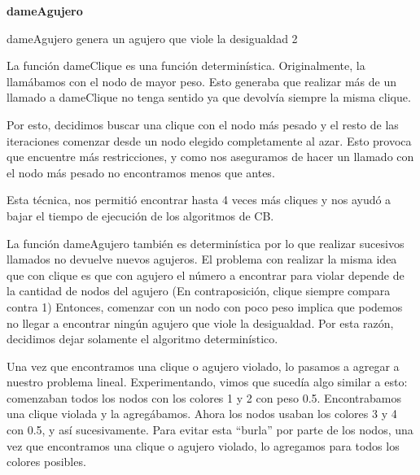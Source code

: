 \documentclass[a4paper, 10pt, twoside]{article}
\begin{document}
\begin{algorithm}[H]
	\textbf{dameAgujero}\\
\caption{dameAgujero genera un agujero que viole la desigualdad 2}
\end{algorithm}


La función dameClique es una función determinística. Originalmente, la llamábamos con el nodo de mayor peso. Esto generaba que realizar más de un llamado a dameClique no tenga sentido ya que devolvía siempre la misma clique. 

Por esto, decidimos buscar una clique con el nodo más pesado y el resto de las iteraciones comenzar desde un nodo elegido completamente al azar. Esto provoca que encuentre más restricciones, y como nos aseguramos de hacer un llamado con el nodo más pesado no encontramos menos que antes.

Esta técnica, nos permitió encontrar hasta 4 veces más cliques y nos ayudó a bajar el tiempo de ejecución de los algoritmos de CB.

La función dameAgujero también es determinística por lo que realizar sucesivos llamados no devuelve nuevos agujeros. El problema con realizar la misma idea que con clique es que con agujero el número a encontrar para violar depende de la cantidad de nodos del agujero (En contraposición, clique siempre compara contra 1) Entonces, comenzar con un nodo con poco peso implica que podemos no llegar a encontrar ningún agujero que viole la desigualdad. Por esta razón, decidimos dejar solamente el algoritmo determinístico.

Una vez que encontramos una clique o agujero violado, lo pasamos a agregar a nuestro problema lineal. Experimentando, vimos que sucedía algo similar a esto: comenzaban todos los nodos con los colores 1 y 2 con peso 0.5. Encontrabamos una clique violada y la agregábamos. Ahora los nodos usaban los colores 3 y 4 con 0.5, y así sucesivamente. Para evitar esta ``burla'' por parte de los nodos, una vez que encontramos una clique o agujero violado, lo agregamos para todos los colores posibles.
\end{document}
